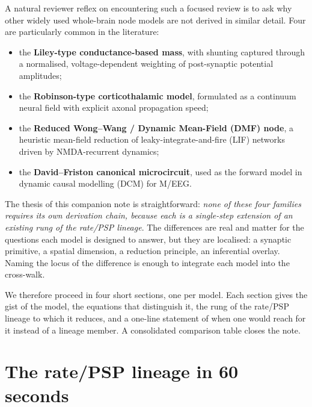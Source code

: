 \documentclass[11pt,a4paper]{article}
\begin{document}
A natural reviewer reflex on encountering such a focused review is to ask why other widely used whole-brain node models are not derived in similar detail. Four are particularly common in the literature:

\begin{itemize}
\item the \textbf{Liley-type conductance-based mass}\cite{LileyCaduschWright1999,LileyCaduschDafilis2002}, with shunting captured through a normalised, voltage-dependent weighting of post-synaptic potential amplitudes;
\item the \textbf{Robinson-type corticothalamic model}\cite{Robinson2001,Rennie2002}, formulated as a continuum neural field with explicit axonal propagation speed;
\item the \textbf{Reduced Wong--Wang / Dynamic Mean-Field (DMF) node}\cite{WongWang2006,Deco2013}, a heuristic mean-field reduction of leaky-integrate-and-fire (LIF) networks driven by NMDA-recurrent dynamics;
\item the \textbf{David--Friston canonical microcircuit}\cite{DavidFriston2003}, used as the forward model in dynamic causal modelling (DCM) for M/EEG.
\end{itemize}

The thesis of this companion note is straightforward: \emph{none of these four families requires its own derivation chain, because each is a single-step extension of an existing rung of the rate/PSP lineage}. The differences are real and matter for the questions each model is designed to answer, but they are localised: a synaptic primitive, a spatial dimension, a reduction principle, an inferential overlay. Naming the locus of the difference is enough to integrate each model into the cross-walk.

We therefore proceed in four short sections, one per model. Each section gives the gist of the model, the equations that distinguish it, the rung of the rate/PSP lineage to which it reduces, and a one-line statement of when one would reach for it instead of a lineage member. A consolidated comparison table closes the note.

\section{The rate/PSP lineage in 60 seconds}
\label{sec:lineage}
\end{document}
